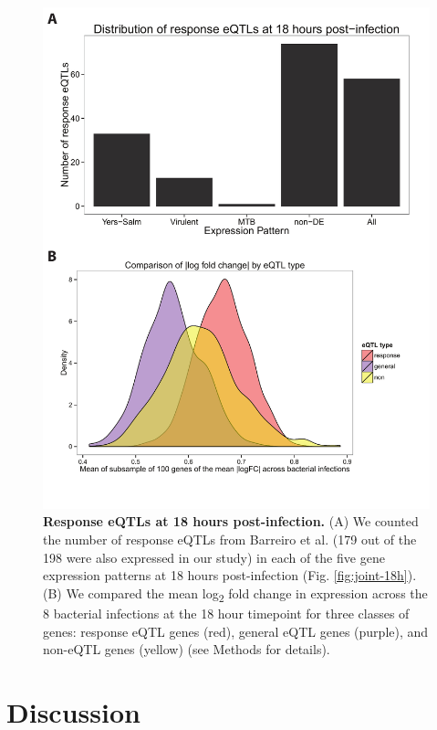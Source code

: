 \begin{figure}
\centering
\includegraphics[width=5in]{img/ch02/fig-05-response-eqtl.pdf}
\caption[Response eQTLs at 18 hours post-infection.]{\textbf{Response
    eQTLs at 18 hours post-infection.} (A) We counted the number of
  response eQTLs from Barreiro et al. \citep{Barreiro2012} (179 out of
  the 198 were also expressed in our study) in each of the five gene
  expression patterns at 18 hours post-infection
  (Fig. \ref{fig:joint-18h}).  (B) We compared the mean
  log\textsubscript{2} fold change in expression across the 8
  bacterial infections at the 18 hour timepoint for three classes of
  genes: response eQTL genes (red), general eQTL genes (purple), and
  non-eQTL genes (yellow) (see Methods for details).  }
\label{fig:response-eqtl}
\end{figure}

\section{Discussion}\label{ch02-discussion}

